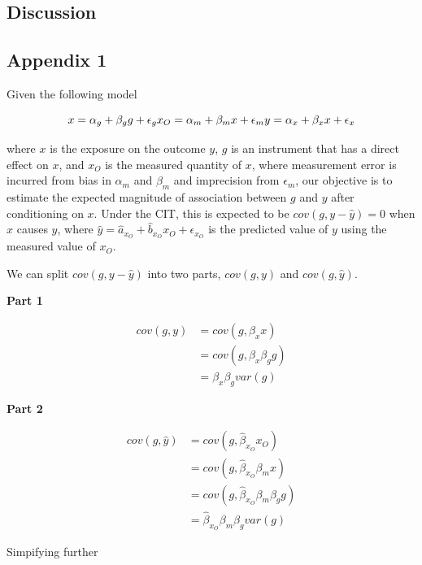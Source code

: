 \documentclass[]{article}
\begin{document}
\subsection{Discussion}\label{discussion}

\subsection{Appendix 1}\label{appendix-1}

Given the following model

\[
x = \alpha_g + \beta_g g + \epsilon_g \\
x_O = \alpha_m + \beta_m x + \epsilon_m \\
y = \alpha_x + \beta_x x + \epsilon_x
\]

where \(x\) is the exposure on the outcome \(y\), \(g\) is an instrument
that has a direct effect on \(x\), and \(x_O\) is the measured quantity
of \(x\), where measurement error is incurred from bias in \(\alpha_m\)
and \(\beta_m\) and imprecision from \(\epsilon_m\), our objective is to
estimate the expected magnitude of association between \(g\) and \(y\)
after conditioning on \(x\). Under the CIT, this is expected to be
\(cov(g, y - \hat{y}) = 0\) when \(x\) causes \(y\), where
\(\hat{y} = \hat{a}_{x_O} + \hat{b}_{x_O} x_O + \epsilon_{x_O}\) is the
predicted value of \(y\) using the measured value of \(x_O\).

We can split \(cov(g, y - \hat{y})\) into two parts, \(cov(g, y)\) and
\(cov(g, \hat{y})\).

\textbf{Part 1}

\[
\begin{aligned}
cov(g, y) & = cov(g, \beta_x x) \\
          & = cov(g, \beta_x \beta_g g) \\
          & = \beta_x\beta_g var(g)
\end{aligned}
\]

\textbf{Part 2}

\[
\begin{aligned}
cov(g, \hat{y}) & = cov(g, \hat{\beta}_{x_O} x_O) \\
                & = cov(g, \hat{\beta}_{x_O} \beta_m x) \\
                & = cov(g, \hat{\beta}_{x_O} \beta_m \beta_g g) \\
                & = \hat{\beta}_{x_O} \beta_m \beta_g var(g)
\end{aligned}
\]

Simpifying further
\end{document}

